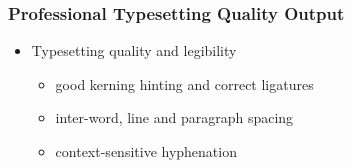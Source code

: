 \begin{frame}
\frametitle{Professional Typesetting Quality Output}
\setlength\fboxsep{.25em}

\begin{itemize}
\item<+-> Typesetting quality and legibility
\begin{itemize}
\item good kerning hinting and correct ligatures
\item inter-word, line and paragraph spacing
\item context-sensitive hyphenation
\end{itemize}
%
\begin{columns}[T]
\begin{column}{.48\linewidth}
\end{column}
\begin{column}{.48\linewidth}
\end{column}
\end{columns}
\end{itemize}
\end{frame}
